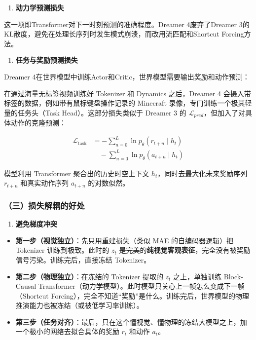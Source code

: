 \begin{enumerate}
\def\labelenumi{\arabic{enumi}.}
\setcounter{enumi}{1}
\tightlist
\item
  \textbf{动力学预测损失}
\end{enumerate}

这一项即Transformer对下一时刻预测的准确程度。Dreamer 4废弃了Dreamer 3的KL散度，避免在处理长序列时发生模式崩溃，而改用流匹配和Shortcut Forcing方法。

\begin{enumerate}
\def\labelenumi{\arabic{enumi}.}
\setcounter{enumi}{2}
\tightlist
\item
  \textbf{任务与奖励预测损失}
\end{enumerate}

Dreamer 4在世界模型中训练Actor和Critic，世界模型需要输出奖励和动作预测：

在通过海量无标签视频训练好 Tokenizer 和 Dynamics 之后，Dreamer 4 会摄入带标签的数据，例如带有鼠标键盘操作记录的 Minecraft 录像，专门训练一个极其轻量的任务头（Task Head）。这部分损失类似于 Dreamer 3 的 \(\mathcal{L}_{pred}\)，但加入了对具体动作的克隆预测：

\[
\begin{aligned}
\mathcal{L}_{\mathrm{task}}
&=
-
\sum_{n=0}^{L}
\ln p_{\theta}(r_{t+n} \mid h_t)
\\
&\quad -
\sum_{n=0}^{L}
\ln p_{\theta}(a_{t+n} \mid h_t)
\end{aligned}
\]

模型利用 Transformer 聚合出的历史时空上下文 \(h_t\)，同时去最大化未来奖励序列 \(r_{t+n}\) 和真实动作序列 \(a_{t+n}\) 的对数似然。

\hypertarget{ux4e09ux635fux5931ux89e3ux8026ux7684ux597dux5904}{%
\subsubsection{（三）损失解耦的好处}\label{ux4e09ux635fux5931ux89e3ux8026ux7684ux597dux5904}}

\begin{enumerate}
\def\labelenumi{\arabic{enumi}.}
\tightlist
\item
  \textbf{避免梯度冲突}
\end{enumerate}

\begin{itemize}
\tightlist
\item
  \textbf{第一步（视觉独立）}：先只用重建损失（类似 MAE 的自编码器逻辑）把 Tokenizer 训练到极致。此时的 \(z_t\) 是完美的\textbf{纯视觉客观表征}，完全没有被奖励信号污染。训练完后，直接冻结 Tokenizer。
\item
  \textbf{第二步（物理独立）}：在冻结的 Tokenizer 提取的 \(z_t\) 之上，单独训练 Block-Causal Transformer（动力学模型）。此时模型只关心上一帧怎么变成下一帧（Shortcut Forcing），完全不知道``奖励''是什么。训练完后，世界模型的物理推演能力也被冻结（或被低学习率训练）。
\item
  \textbf{第三步（任务对齐）}：最后，只在这个懂视觉、懂物理的冻结大模型之上，加一个极小的网络去拟合具体的奖励 \(r_t\) 和动作 \(a_t\)。
\end{itemize}

